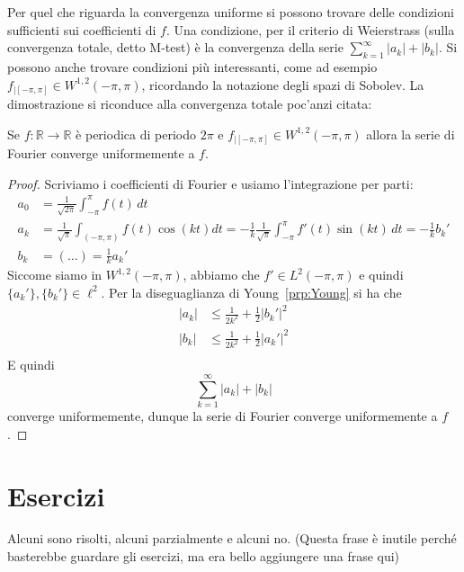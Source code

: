 Per quel che riguarda la convergenza uniforme si possono trovare delle
condizioni sufficienti sui coefficienti di \(f\). Una condizione, per il
criterio di Weierstrass (sulla convergenza totale, detto M-test) è la
convergenza della serie \(\sum_{k=1}^\infty |a_k| + |b_k|\). Si possono anche
trovare condizioni più interessanti, come ad esempio \(f_{|[-\pi, \pi]} \in
W^{1,2}(-\pi, \pi)\), ricordando la notazione degli spazi di Sobolev. La
dimostrazione si riconduce alla convergenza totale poc'anzi citata: 

\begin{proposition}
    Se \(f: \mathbb R \rightarrow \mathbb R\) è periodica di periodo \(2\pi\) e
    \(f_{|[-\pi, \pi]} \in W^{1, 2}(-\pi, \pi)\) allora la serie di Fourier
    converge uniformemente a \(f\).
\end{proposition}

\begin{proof}
    Scriviamo i coefficienti di Fourier e usiamo l'integrazione per parti: 
    \[
     \begin{aligned}
    a_0 &= \frac{1}{\sqrt{2\pi}} \int_{-\pi}^\pi f(t) \, dt \\
    a_k &=    \frac{1}{\sqrt{\pi}} \int_{(-\pi, \pi)} f(t) \cos(kt) dt  =
    -\frac{1}{k} \frac{1}{\sqrt{\pi}} \int_{-\pi}^\pi f'(t) \sin(kt) \, dt =
    -\frac{1}{k}b_k' \\
    b_k &= (\dots) = \frac{1}{k}a_k'
    \end{aligned}     
    \]
    Siccome siamo in \(W^{1,2}(-\pi, \pi)\), abbiamo che \(f' \in L^2(-\pi,
    \pi)\) e quindi \(\{a_k'\}, \{b_k'\} \in \ell^2\). Per la diseguaglianza di
    Young~\ref{prp:Young} si ha che
    \[
    \begin{aligned}
        |a_k| &\leq \frac{1}{2k^2} + \frac{1}{2}|b_k'|^2 \\
        |b_k| &\leq \frac{1}{2k^2} + \frac{1}{2}|a_k'|^2 \\
    \end{aligned}
    \]
    E quindi 
    \[
    \sum_{k=1}^\infty |a_k| + |b_k|
    \]
    converge uniformemente, dunque la serie di Fourier converge uniformemente a \(f\).
\end{proof}

\newpage

\section{Esercizi}
Alcuni sono risolti, alcuni parzialmente e alcuni no. (Questa frase è inutile
perché basterebbe guardare gli esercizi, ma era bello aggiungere una frase qui)

